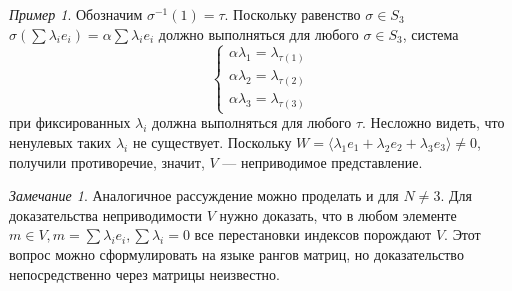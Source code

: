 \documentclass{article}
\theoremstyle{definition}
\theoremstyle{remark}
\newtheorem*{remark}{Замечание}
\newtheorem*{example}{Пример}
\begin{document}
\begin{example}
    Обозначим $\sigma^{-1}(1) = \tau$. Поскольку равенство $\sigma \in S_3$ $\sigma(\sum \lambda_i e_i) = \alpha \sum \lambda_i e_i$ должно выполняться для любого $\sigma \in S_3$, система
    \begin{equation*}
        \begin{cases*}
            \alpha \lambda_1 = \lambda_{\tau(1)} \\
            \alpha \lambda_2 = \lambda_{\tau(2)} \\
            \alpha \lambda_3 = \lambda_{\tau(3)}
        \end{cases*}
    \end{equation*}
    при фиксированных $\lambda_i$ должна выполняться для любого $\tau$. Несложно видеть, что ненулевых таких $\lambda_i$ не существует. Поскольку $W = \langle \lambda_1 e_1 + \lambda_2 e_2 + \lambda_3 e_3 \rangle \neq 0$, получили противоречие, значит, $V$ --- неприводимое представление. %
\end{example}

\begin{remark}
    Аналогичное рассуждение можно проделать и для $N \neq 3$. Для доказательства неприводимости $V$ нужно доказать, что в любом элементе $m \in V, m = \sum \lambda_i e_i, \sum \lambda_i = 0$ все перестановки индексов порождают $V$. Этот вопрос можно сформулировать на языке рангов матриц, но доказательство непосредственно через матрицы неизвестно.
\end{remark}
\end{document}

